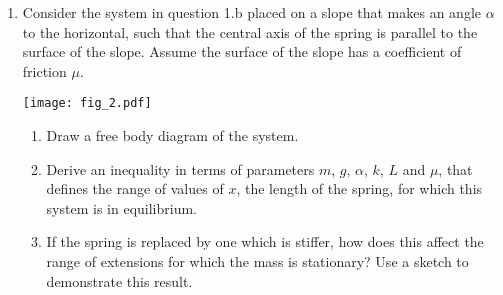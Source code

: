 {\begin{enumerate}
\item Consider the system in question 1.b placed on a slope that makes an angle $\alpha$ to the horizontal, such that the central axis of the spring is parallel to the surface of the slope. Assume the surface of the slope has a coefficient of friction $\mu$.
            \begin{center}
                \texttt{[image: fig\_2.pdf]}
            \end{center}
	\begin{enumerate}
		\item Draw a free body diagram of the system.
		\item Derive an inequality in terms of parameters $m$, $g$, $\alpha$, $k$, $L$ and $\mu$,  that defines the range of values of $x$, the length of the spring, for 					which this system is in equilibrium.
		\item If the spring is replaced by one which is stiffer, how does this affect the range of extensions for which the mass is stationary? Use a sketch to demonstrate this result.
	\end{enumerate}
\end{enumerate}
}

